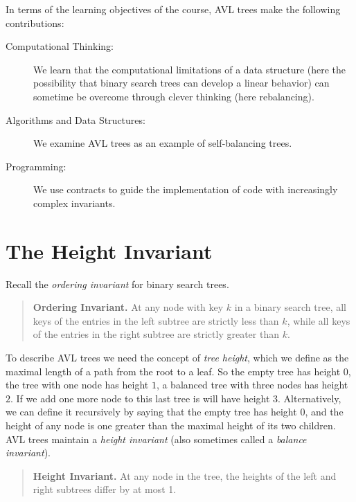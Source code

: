 \begin{gram}
In terms of the learning objectives of the course, AVL trees make the
following contributions:
\begin{description}
\item[Computational Thinking: ]%
  We learn that the computational limitations of a data structure (here the
  possibility that binary search trees can develop a linear behavior) can
  sometime be overcome through clever thinking (here rebalancing).

\item[Algorithms and Data Structures: ]%
  We examine AVL trees as an example of self-balancing trees.

\item[Programming: ]%
  We use contracts to guide the implementation of code with increasingly
  complex invariants.
\end{description}
\end{gram}


\section{The Height Invariant}
\label{sec:avl:height_invariant}

Recall the \emph{ordering invariant} for binary search trees.
\begin{quote}
  \noindent\textbf{Ordering Invariant.} At any node with key $k$ in a
  binary search tree, all keys of the entries in the left subtree are
  strictly less than $k$, while all keys of the entries in the right
  subtree are strictly greater than $k$.
\end{quote}

To describe AVL trees we need the concept of \emph{tree height}, which
we define as the maximal length of a path from the root to a leaf.  So
the empty tree has height $0$, the tree with one node has height $1$,
a balanced tree with three nodes has height $2$.  If we add one more
node to this last tree is will have height $3$.  Alternatively, we can
define it recursively by saying that the empty tree has height $0$,
and the height of any node is one greater than the maximal height of
its two children.  AVL trees maintain a \emph{height invariant} (also
sometimes called a \emph{balance invariant}).
\begin{quote}
  \noindent\textbf{Height Invariant.} At any node in the tree,
  the heights of the left and right subtrees differ by at most 1.
\end{quote}

